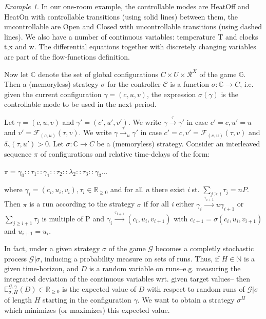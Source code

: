   

    \emph{Example 1}. In our one-room example, the controllable modes are {\color{RawSienna} HeatOff}
    and {\color{RawSienna} HeatOn} with controllable transitions (using solid lines) between
    them, the uncontrollable are {\color{RawSienna} Open} and {\color{RawSienna} Closed} with
    uncontrollable transitions (using dashed lines). We also have a number of continuous 
    variables: temperature T and clocks t,x and w. The differential equations together with
    discretely changing variables are part of the flow-functions definition.

    Now let $\mathbb{C}$ denote the set of global configurations $C\times U \times \mathcal{R}^X$
    of the game $\mathbb{G}$. Then a (memoryless) strategy $\sigma$ for the controller $\mathcal{C}$
    is a function $\sigma: \mathbb{C} \rightarrow C$, i.e. given the current
    configuration $\gamma = (c,u,v)$, the expression $\sigma(\gamma)$ is the controllable mode
    to be used in the next period.

    Let $\gamma = (c,u,v)$ and $\gamma' = (c',u',v')$. We write $\gamma \xrightarrow{\tau} \gamma'$ 
    in case $c'=c, u'=u$ and $v'=\mathcal{F}_{(c,u)}(\tau,v)$. We 
    write $\gamma \xrightarrow{\tau}_{u} \gamma'$ in case $c'=c, v'=\mathcal{F}_{(c,u)}(\tau,v)$
    and $\delta_{\gamma}(\tau,u') > 0$. Let $\sigma: \mathbb{C} \rightarrow C$
    be a (memoryless) strategy. Consider an interleaved sequence $\pi$ of configurations and
    relative time-delays of the form:
    
    \begin{center}
      $\pi = \gamma_0 :: \tau_1 :: \gamma_1 :: \tau_2 :: \lambda_2 :: \tau_3 :: \gamma_3 ...$  
    \end{center}

    where $\gamma_i = (c_i,u_i,v_i), \tau_i \in \mathbb{R}_{\geqslant 0}$ and for all \emph{n} 
    there  exist \emph{i} st. $\sum_{j \geqslant i}\tau_j = nP$. Then $\pi$ is a run according
    to the strategy $\sigma$ if for all \emph{i} either $\gamma_i \xrightarrow{\tau_{i+1}}u \gamma_{i+1}$
    or $\sum_{j \geqslant i+1}\tau_j$ is multiple of P and $\gamma_i \xrightarrow{\tau_{i+1}} (c_i,u_i,v_{i+1})$
    with $c_{i+1} = \sigma(c_i,u_i,v_{i+1})$ and $u_{i+1}=u_i$.

    In fact, under a given strategy $\sigma$ of the game $\mathcal{G}$ becomes a completly 
    stochastic process $\mathcal{G}|\sigma$, inducing a probability measure on sets of runs.
    Thus, if $H \in \mathbb{N}$ is a given time-horizon, and $D$ is a random variable on runs--e.g.
    measuring the integrated deviation of the continuous variables wrt. given target values--
    then $\mathbb{E}^{\mathcal{G,\gamma}}_{\sigma,H}(D) \in \mathbb{R}_{\geqslant 0}$ is 
    the expected value of $D$ with respect to random runs of $\mathcal{G}|\sigma$ of length
    $H$ starting in the configuration $\gamma$. We want to obtain a strategy $\sigma^H$ which
    minimizes (or maximizes) this expected value.


